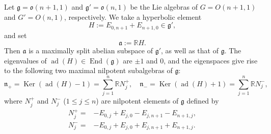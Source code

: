 Let ${\mathfrak{g}} = {\mathfrak{o}}(n+1,1)$
 and ${\mathfrak{g}}' = {\mathfrak{o}}(n,1)$
 be the Lie algebras
 of 
$G=O(n+1,1)$
 and 
$G'=O(n,1)$, 
 respectively.  
We take a hyperbolic element 
\begin{equation}
\label{eqn:Hyp}
 H:= E_{0,n+1} + E_{n+1,0} \in {\mathfrak{g}}', 
\end{equation}
 and set 
\[
  {\mathfrak {a}}:={\mathbb{R}}H.  
\]
Then ${\mathfrak{a}}$ is a maximally split abelian subspace
 of ${\mathfrak{g}}'$, 
 as well as that of ${\mathfrak{g}}$.
The eigenvalues of 
 $\operatorname{ad} (H) \in \operatorname{End}({\mathfrak{g}})$
 are $\pm 1$ and $0$, 
 and the eigenspaces give rise to the following two maximal nilpotent subalgebras
 of ${\mathfrak {g}}$:
\begin{equation}
\label{eqn:ngen}
{\mathfrak {n}}_+=\operatorname{Ker} (\operatorname{ad}(H)-1)
                 =\sum_{j=1}^n {\mathbb{R}} N_j^+, 
\quad
{\mathfrak {n}}_-=\operatorname{Ker} (\operatorname{ad}(H)+1)
                 =\sum_{j=1}^n {\mathbb{R}} N_j^-, 
\end{equation}
where $N_j^+$ and $N_j^-$
 ($1 \le j \le n$) are nilpotent elements
 of ${\mathfrak{g}}$ defined by 
\begin{align*}
N_j^+=&-E_{0,j} + E_{j,0} - E_{j,n+1} -E_{n+1,j}, 
\\
N_j^-=&-E_{0,j} + E_{j,0} + E_{j,n+1} +E_{n+1,j}.  
\end{align*}



